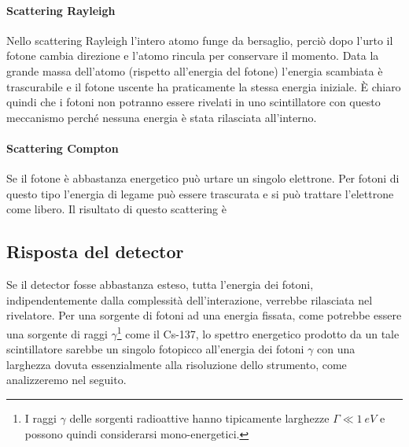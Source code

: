  
 \paragraph{Scattering Rayleigh}
 Nello scattering Rayleigh l'intero atomo funge da bersaglio, perciò dopo l'urto il fotone cambia direzione e l'atomo rincula per conservare il momento. Data la grande massa dell'atomo (rispetto all'energia del fotone) l'energia scambiata è trascurabile e il fotone uscente ha praticamente la stessa energia iniziale. \`E chiaro quindi che i fotoni non potranno essere rivelati in uno scintillatore con questo meccanismo perché nessuna energia è stata rilasciata all'interno.
 
 \paragraph{Scattering Compton}
 Se il fotone è abbastanza energetico può urtare un singolo elettrone. Per fotoni di questo tipo l'energia di legame può essere trascurata e si può trattare l'elettrone come libero. Il risultato di questo scattering è 
 
 \subsection{Risposta del detector}
 Se il detector fosse abbastanza esteso, tutta l'energia dei fotoni, indipendentemente dalla complessità dell'interazione, verrebbe rilasciata nel rivelatore. Per una sorgente di fotoni ad una energia fissata, come potrebbe essere una sorgente di raggi $\gamma$\footnote{I raggi $\gamma$ delle sorgenti radioattive hanno tipicamente larghezze $\Gamma \ll \SI{1}{eV}$ e possono quindi considerarsi mono-energetici.} come il Cs-137, lo spettro energetico prodotto da un tale scintillatore sarebbe un singolo fotopicco all'energia dei fotoni $\gamma$ con una larghezza dovuta essenzialmente alla risoluzione dello strumento, come analizzeremo nel seguito.
 
